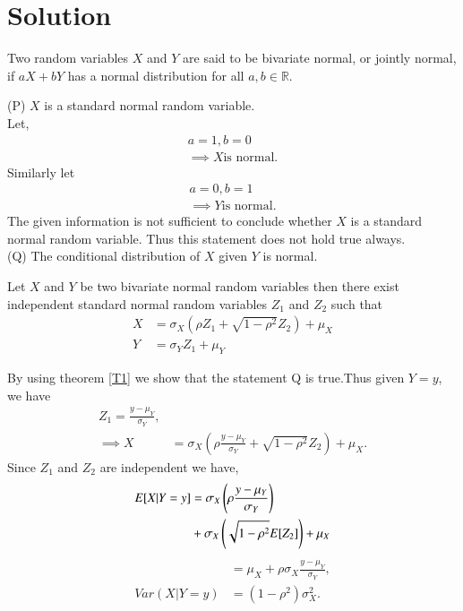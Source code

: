 \documentclass[journal,12pt,twocolumn]{IEEEtran}
\begin{document}
\section{Solution}
\begin{definition}
Two random variables $X$ and $Y$ are said to be bivariate normal, or jointly normal, if $aX+bY$ has a normal distribution for all $a,b \in \mathbb{R}$.
\end{definition}
(P) $X$ is a standard normal random  variable.\\
Let,
\begin{align}
 a=1,b=0  \\
  \implies X \text{is normal}.
\end{align}
 Similarly let
 \begin{align}
    a=0,b=1 \\
    \implies Y \text{is normal}.
 \end{align}
The given information is not sufficient to conclude whether $X$ is a standard normal random variable.
Thus this statement does not hold true always.
\\
(Q) The conditional distribution of $X$ given $Y$ is normal.\\
\begin{theorem}
Let $X$ and $Y$ be two bivariate normal random variables then there exist independent standard normal random variables $Z_1$ and $Z_2$ such that \label{T1}
\begin{align}
    X&=\sigma_X (\rho Z_1 +\sqrt{1-\rho^2} Z_2)+\mu_X  \\
    Y&=\sigma_Y Z_1+\mu_Y 
 \end{align}
\end{theorem}
By using theorem \ref{T1} we show that the statement Q is true.Thus given $Y=y$, we have
\begin{align}
Z_1=\frac{y-\mu_Y}{\sigma_Y},\\
\implies X&=\sigma_X (\rho\frac{y-\mu_Y}{\sigma_Y} +\sqrt{1-\rho^2} Z_2)+\mu_X .
\end{align}
Since $Z_1$ and $Z_2$ are independent we have,
\begin{equation}
    \begin{aligned}
  E[X|Y=y]&= \sigma_X \left(\rho\frac{y-\mu_Y}{\sigma_Y}\right) \\ &+\sigma_X\left(\sqrt{1-\rho^2} E[Z_2]\right)+\mu_X
  \end{aligned}
\end{equation}
\begin{align}
 &=\mu_X+ \rho \sigma_X \frac{y-\mu_Y}{\sigma_Y},\\
  Var(X|Y=y)&=(1-\rho^2)\sigma^2_X.     
\end{align}
\end{document}
